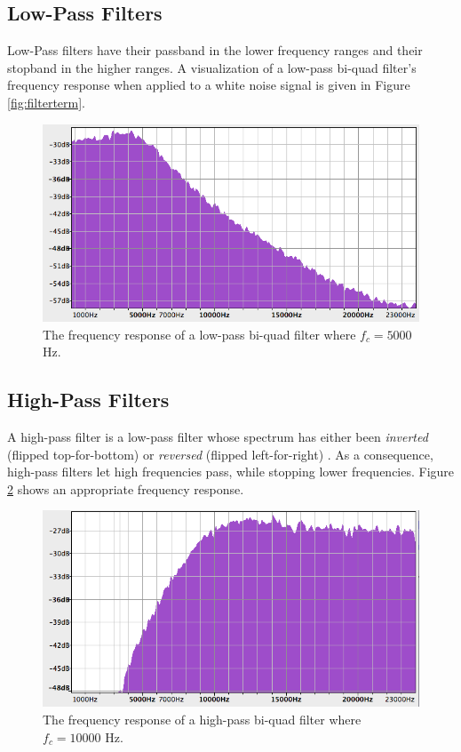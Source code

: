 \documentclass[12pt,twoside]{report}
\begin{document}
\subsection{Low-Pass Filters}

Low-Pass filters have their passband in the lower frequency ranges and their stopband in the higher ranges. A visualization of a low-pass bi-quad filter's frequency response when applied to a white noise signal\footnotemark{} is given in Figure \ref{fig:filterterm}.

\begin{figure}[p!]
  \includegraphics[scale=0.6]{img/lowpass}
  \caption{The frequency response of a low-pass bi-quad filter where $f_{c} = 5000$ Hz.}
  \label{fig:lowpass}
\end{figure}


\subsection{High-Pass Filters}

A high-pass filter is a low-pass filter whose spectrum has either been \emph{inverted} (flipped top-for-bottom) or \emph{reversed} (flipped left-for-right) . As a consequence, high-pass filters let high frequencies pass, while stopping lower frequencies. Figure \ref{fig:highpass} shows an appropriate frequency response.

\begin{figure}[p!]
  \includegraphics[scale=0.6]{img/highpass}
  \caption{The frequency response of a high-pass bi-quad filter where $f_{c} = 10000$ Hz.}
  \label{fig:highpass}
\end{figure}
\end{document}
